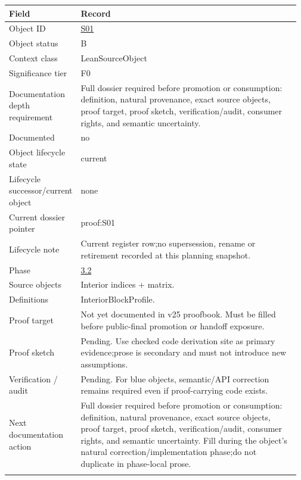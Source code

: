 \begin{longtable}{L{0.16\linewidth} L{0.81\linewidth}}
\hline
\textbf{Field} & \textbf{Record}\\
\hline
Object ID & \hyperlink{object-row-S01}{S01}\\
\hline\addlinespace[0.20em]
Object status & B\\
\hline\addlinespace[0.20em]
Context class & LeanSourceObject\\
\hline\addlinespace[0.20em]
Significance tier & F0\\
\hline\addlinespace[0.20em]
Documentation depth requirement & Full dossier required before promotion or consumption: definition, natural provenance, exact source objects, proof target, proof sketch, verification/\allowbreak{}audit, consumer rights, and semantic uncertainty.\\
\hline\addlinespace[0.20em]
Documented & no\\
\hline\addlinespace[0.20em]
Object lifecycle state & current\\
\hline\addlinespace[0.20em]
Lifecycle successor/\allowbreak{}current object & none\\
\hline\addlinespace[0.20em]
Current dossier pointer & proof:S01\\
\hline\addlinespace[0.20em]
Lifecycle note & Current register row;\newline no supersession, rename or retirement recorded at this planning snapshot.\\
\hline\addlinespace[0.20em]
Phase & \hyperlink{phase-row-3-2}{3.2}\\
\hline\addlinespace[0.20em]
Source objects & Interior indices + matrix.\\
\hline\addlinespace[0.20em]
Definitions & InteriorBlockProfile.\\
\hline\addlinespace[0.20em]
Proof target & Not yet documented in v25 proofbook. Must be filled before public-final promotion or handoff exposure.\\
\hline\addlinespace[0.20em]
Proof sketch & Pending. Use checked code derivation site as primary evidence;\newline prose is secondary and must not introduce new assumptions.\\
\hline\addlinespace[0.20em]
Verification /\allowbreak{} audit & Pending. For blue objects, semantic/\allowbreak{}API correction remains required even if proof-carrying code exists.\\
\hline\addlinespace[0.20em]
Next documentation action & Full dossier required before promotion or consumption: definition, natural provenance, exact source objects, proof target, proof sketch, verification/\allowbreak{}audit, consumer rights, and semantic uncertainty. Fill during the object's natural correction/\allowbreak{}implementation phase;\newline do not duplicate in phase-local prose.\\
\hline\addlinespace[0.20em]
\end{longtable}
